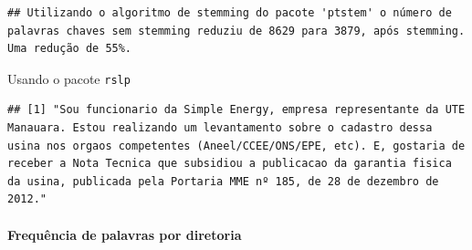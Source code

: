 \documentclass[]{article}
\newenvironment{Shaded}{\begin{snugshade}}{\end{snugshade}}
\newcommand{\KeywordTok}[1]{\textcolor[rgb]{0.13,0.29,0.53}{\textbf{#1}}}
\newcommand{\DataTypeTok}[1]{\textcolor[rgb]{0.13,0.29,0.53}{#1}}
\newcommand{\DecValTok}[1]{\textcolor[rgb]{0.00,0.00,0.81}{#1}}
\newcommand{\StringTok}[1]{\textcolor[rgb]{0.31,0.60,0.02}{#1}}
\newcommand{\OtherTok}[1]{\textcolor[rgb]{0.56,0.35,0.01}{#1}}
\newcommand{\OperatorTok}[1]{\textcolor[rgb]{0.81,0.36,0.00}{\textbf{#1}}}
\newcommand{\NormalTok}[1]{#1}
\let\oldparagraph\paragraph
\renewcommand{\paragraph}[1]{\oldparagraph{#1}\mbox{}}
\begin{document}
\begin{verbatim}
## Utilizando o algoritmo de stemming do pacote 'ptstem' o número de palavras chaves sem stemming reduziu de 8629 para 3879, após stemming. Uma redução de 55%.
\end{verbatim}

Usando o pacote \texttt{rslp}

\begin{Shaded}
\end{Shaded}

\begin{verbatim}
## [1] "Sou funcionario da Simple Energy, empresa representante da UTE Manauara. Estou realizando um levantamento sobre o cadastro dessa usina nos orgaos competentes (Aneel/CCEE/ONS/EPE, etc). E, gostaria de receber a Nota Tecnica que subsidiou a publicacao da garantia fisica da usina, publicada pela Portaria MME nº 185, de 28 de dezembro de 2012."
\end{verbatim}

\begin{Shaded}
\end{Shaded}

\paragraph{Frequência de palavras por
diretoria}\label{frequencia-de-palavras-por-diretoria-2}

\begin{Shaded}
\end{Shaded}
\end{document}
